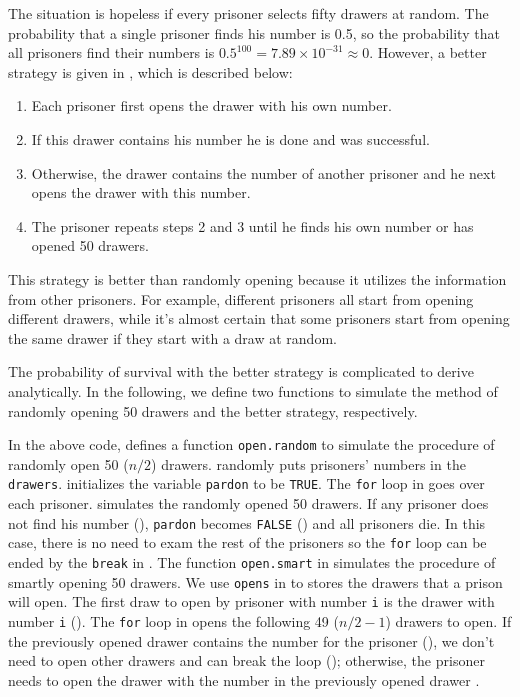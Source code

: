 The situation is hopeless if every prisoner selects fifty drawers at
random. The probability that a single prisoner finds his number is
0.5, so the probability that all prisoners find their numbers is
$0.5^{100} = 7.89\times10^{-31}\approx0$. However, a better strategy
is given in \citep{stanley2013algebraic}, which is described below:
\begin{enumerate}
\item Each prisoner first opens the drawer with his own number.
\item If this drawer contains his number he is done and was
  successful.
\item Otherwise, the drawer contains the number of another prisoner
  and he next opens the drawer with this number.
\item The prisoner repeats steps 2 and 3 until he finds his own number
  or has opened 50 drawers.
\end{enumerate}

This strategy is better than randomly opening because it utilizes the
information from other prisoners. For example, different prisoners all start
from opening different drawers, while it's almost certain that some prisoners
start from opening the same drawer if they start with a draw at random.

The probability of survival with the better strategy is complicated to derive
analytically.  In the following, we define two functions to simulate the method
of randomly opening 50 drawers and the better strategy, respectively.


In the above code,  defines a function \lstinline{open.random} to
simulate the procedure of randomly open 50 ($n/2$) drawers. 
randomly puts prisoners' numbers in the \lstinline{drawers}.  initializes
the variable \lstinline{pardon} to be \lstinline{TRUE}. The \lstinline{for} loop in
 goes over each prisoner.  simulates the randomly opened
50 drawers. If any prisoner does not find his number (),
\lstinline{pardon} becomes \lstinline{FALSE} () and all prisoners die. In this
case, there is no need to exam the rest of the prisoners so the \lstinline{for} loop
can be ended by the \lstinline{break} in . The function \lstinline{open.smart}
in  simulates the procedure of smartly opening 50 drawers. We use
\lstinline{opens} in  to stores the drawers that a prison will open. The
first draw to open by prisoner with number \lstinline{i} is the drawer with number
\lstinline{i} (). The \lstinline{for} loop in  opens the following 49
($n/2-1$) drawers to open. If the previously opened drawer contains the number
for the prisoner (), we don't need to open other drawers and can
break the loop (); otherwise, the prisoner needs to open the drawer
with the number in the previously opened drawer .

